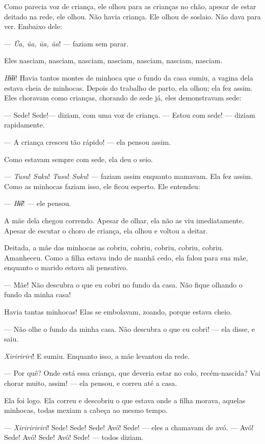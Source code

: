 Como parecia voz de criança, ele olhou para as crianças no chão, apesar
de estar deitado na rede, ele olhou. Não havia criança. Ele olhou de
soslaio. Não dava para ver. Embaixo dele:

--- \textit{Ũa, ũa, ũa, ũa}! --- faziam sem parar. 

Eles nasciam, nasciam, nasciam, nasciam, nasciam, nasciam, nasciam. 

\textit{Hɨ̃ɨɨ}! Havia tantos montes de minhoca que o fundo da casa sumiu, a vagina
dela estava cheia de minhocas. Depois do trabalho de parto, ela
olhou; ela fez assim. Eles choravam como crianças, chorando de sede
já, eles demonstravam sede: 

--- Sede! Sede!--- diziam, com uma voz de criança. --- Estou com sede! ---
diziam rapidamente. 

--- A criança cresceu tão rápido! --- ela pensou assim. 

Como estavam sempre com sede, ela deu o seio. 

--- \textit{Tusu}! \textit{Suku}! \textit{Tusu}! \textit{Suku}! --- faziam assim enquanto mamavam. Ela
fez assim. Como as minhocas faziam isso, ele ficou esperto. Ele
entendeu: 

--- \textit{Hɨ̃ɨ}! --- ele pensou. 

A mãe dela chegou correndo. Apesar de olhar, ela não as viu
imediatamente. Apesar de escutar o choro de criança, ela olhou e voltou
a deitar. 

Deitada, a mãe das minhocas as cobriu, cobriu, cobriu, cobriu, cobriu.
Amanheceu. Como a filha estava indo de manhã cedo, ela falou para sua
mãe, enquanto o marido estava ali pensativo.

--- Mãe! Não descubra o que eu cobri no fundo da casa. Não fique olhando
o fundo da minha casa! 

Havia tantas minhocas! Elas se embolavam, zoando, porque estava cheio. 

--- Não olhe o fundo da minha casa. Não descubra o que eu cobri! --- ela
disse, e saiu. 

\textit{Xiriririri}! E sumiu. Enquanto isso, a mãe levantou da rede. 

--- Por quê? Onde está essa criança, que deveria estar no colo,
recém-nascida? Vai chorar muito, assim! --- ela pensou, e correu até a
casa. 

Ela foi logo. Ela correu e descobriu o que estava onde a filha morava,
aquelas minhocas, todas mexiam a cabeça ao mesmo tempo. 

--- \textit{Xiririririri}! Sede! Sede! Sede! Avó! Sede! --- eles a chamavam de
avó. --- Avó! Sede! Avó! Sede! Avó! Sede! --- todos diziam. 

